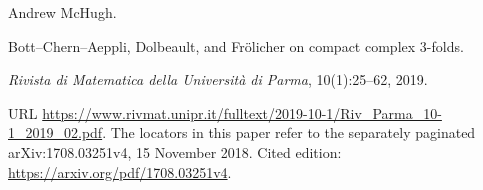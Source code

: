 Andrew McHugh.

\newblock Bott--Chern--Aeppli, Dolbeault, and Fr{\"o}licher on compact
  complex $3$-folds.

\newblock \emph{Rivista di Matematica della Universit\`a di Parma},
  10(1):25--62, 2019.

\newblock URL
  \url{https://www.rivmat.unipr.it/fulltext/2019-10-1/Riv_Parma_10-1_2019_02.pdf}.
\newblock The locators in this paper refer to the separately paginated
  arXiv:1708.03251v4, 15 November 2018.
\newblock Cited edition: \url{https://arxiv.org/pdf/1708.03251v4}.
